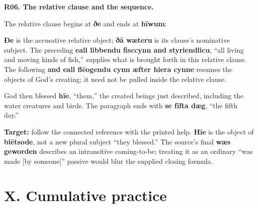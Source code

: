 \par\begin{minipage}{\linewidth}\raggedright
\textbf{R06. The relative clause and the sequence.}

The relative clause begins at \textbf{ðe} and ends at \textbf{hīwum}:

\par\begin{minipage}{\linewidth}\raggedright
{}
\end{minipage}\par

\textbf{Ðe} is the accusative relative object; \textbf{ðā wæteru} is its clause’s nominative subject. The preceding \textbf{eall libbendu fisccynn and styriendlicu}, “all living and moving kinds of fish,” supplies what is brought forth in this relative clause. The following \textbf{and eall flēogendu cynn æfter hiera cynne} resumes the objects of God’s creating; it need not be pulled inside the relative clause.

God then blessed \textbf{hīe}, “them,” the created beings just described, including the water creatures and birds. The paragraph ends with \textbf{se fīfta dæg}, “the fifth day.”

\textbf{Target:} follow the connected reference with the printed help. \textbf{Hīe} is the object of \textbf{blētsode}, not a new plural subject “they blessed.” The source’s final \textbf{wæs geworden} describes an intransitive coming-to-be; treating it as an ordinary “was made [by someone]” passive would blur the supplied closing formula.

\end{minipage}\par\addvspace{4pt}

\section*{X. Cumulative practice}

